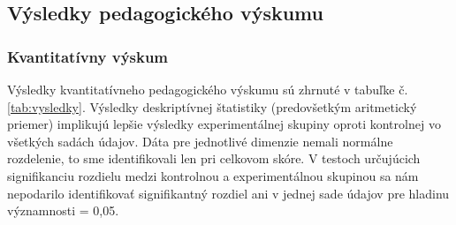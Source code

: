 \newpage
\subsection{Výsledky pedagogického výskumu}
\subsubsection{Kvantitatívny výskum}
Výsledky kvantitatívneho pedagogického výskumu sú zhrnuté v tabuľke č. \ref{tab:vysledky}. Výsledky deskriptívnej štatistiky (predovšetkým aritmetický priemer) implikujú lepšie výsledky experimentálnej skupiny oproti 
kontrolnej vo všetkých sadách údajov. Dáta pre jednotlivé dimenzie nemali normálne rozdelenie, to sme identifikovali len pri celkovom skóre. V testoch určujúcich signifikanciu rozdielu medzi kontrolnou a experimentálnou
skupinou sa nám nepodarilo identifikovať signifikantný rozdiel ani v jednej sade údajov pre hladinu významnosti \alpha{} = 0,05.

